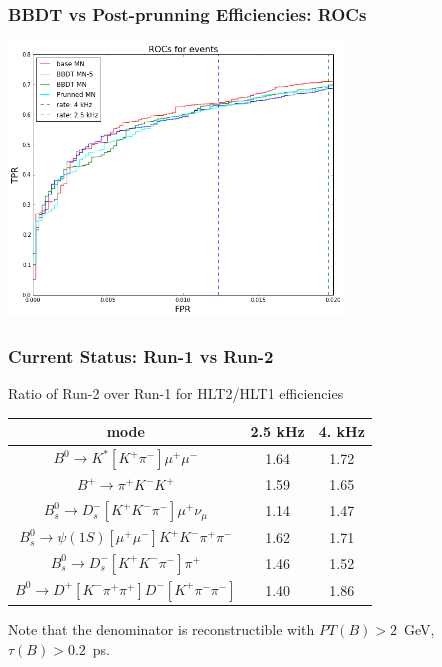\documentclass[xcolor=svgnames]{beamer}
\begin{document}
\begin{frame}\frametitle{BBDT vs Post-prunning Efficiencies: ROCs}
\begin{center}
 \includegraphics[width=3.5in]{images/prun-roc.png} 
 \end{center}
\end{frame}




\begin{frame}\frametitle{Current Status: Run-1 vs Run-2}
  \begin{center}
  Ratio of Run-2 over Run-1 for HLT2/HLT1 efficiencies
  \vspace{0.4cm}
  
    \begin{tabular}{c|c|c}
    mode & 2.5 kHz & 4. kHz  \\ \hline 
    $B^0\to K^*[K^+\pi^-]\mu^+\mu^-$ & 1.64 & 1.72   \\ 
    $B^+\to \pi^+K^-K^+$ & 1.59 & 1.65 \\ 
    $B^0_s\to D_s^-[K^+K^-\pi^-]\mu^+\nu_\mu$ & 1.14 & 1.47 \\ 
    $B^0_s\to \psi(1S)[\mu^+\mu^-]K^+K^-\pi^+\pi^-$ & 1.62 & 1.71 \\ 
    $B^0_s\to D_s^-[K^+K^-\pi^-]\pi^+$ & 1.46 & 1.52 \\ 
    $B^0\to D^+[K^-\pi^+\pi^+]D^-[K^+\pi^-\pi^-]$ & 1.40 & 1.86  \\ \hline

    \end{tabular}
\end{center}


\vspace{0.6cm}
Note that the denominator is reconstructible with $PT(B)>2$~GeV, $\tau(B)>0.2$~ps.
\end{frame}
\end{document}
